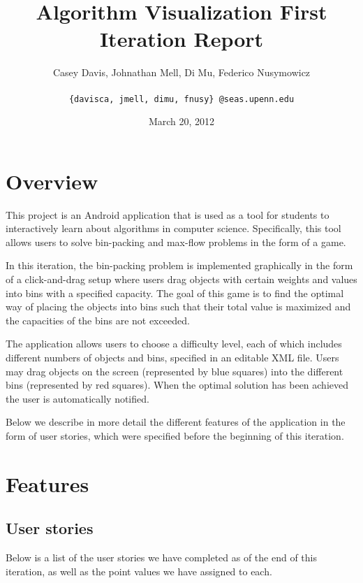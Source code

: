 \documentclass[11pt]{article}
\title{Algorithm Visualization First Iteration Report}
\author{Casey Davis, Johnathan Mell, Di Mu, Federico Nusymowicz \\\\
\texttt{\{davisca, jmell, dimu, fnusy\} @seas.upenn.edu}}
\date{March 20, 2012}
\begin{document}
\maketitle

\section{Overview}

This project is an Android application that is used as a tool for students to
interactively learn about algorithms in computer science.  Specifically, this
tool allows users to solve bin-packing and max-flow problems in the form of a
game.

In this iteration, the bin-packing problem is implemented graphically in
the form of a click-and-drag setup where users drag objects with certain weights
and values into bins with a specified capacity.  The goal of this game is to
find the optimal way of placing the objects into bins such that their total
value is maximized and the capacities of the bins are not exceeded.

The application allows users to choose a difficulty level, each of which
includes different numbers of objects and bins, specified in an editable XML
file.  Users may drag objects on the screen (represented by blue squares) into
the different bins (represented by red squares).  When the optimal solution has
been achieved the user is automatically notified.

Below we describe in more detail the different features of the application in
the form of user stories, which were specified before the beginning of this
iteration.

\section{Features}

\subsection{User stories}

Below is a list of the user stories we have completed as of the end of this
iteration, as well as the point values we have assigned to each.
\end{document}
